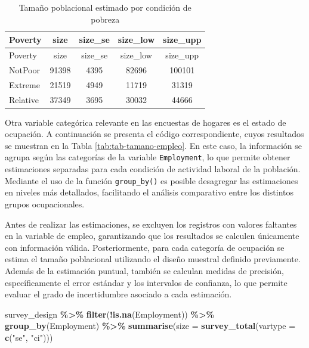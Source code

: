 \documentclass[
  spanish,
  12pt,
]{book}
\newenvironment{Shaded}{\begin{snugshade}}{\end{snugshade}}
\newcommand{\AttributeTok}[1]{\textcolor[rgb]{0.13,0.29,0.53}{#1}}
\newcommand{\FunctionTok}[1]{\textcolor[rgb]{0.13,0.29,0.53}{\textbf{#1}}}
\newcommand{\NormalTok}[1]{#1}
\newcommand{\SpecialCharTok}[1]{\textcolor[rgb]{0.81,0.36,0.00}{\textbf{#1}}}
\newcommand{\StringTok}[1]{\textcolor[rgb]{0.31,0.60,0.02}{#1}}
\begin{document}
\begin{longtable}[]{@{}lcccc@{}}
\caption{\label{tab:tab-tamano-pobreza}Tamaño poblacional estimado por condición de pobreza}\tabularnewline
\toprule\noalign{}
Poverty & size & size\_se & size\_low & size\_upp \\
\midrule\noalign{}
\endfirsthead
\toprule\noalign{}
Poverty & size & size\_se & size\_low & size\_upp \\
\midrule\noalign{}
\endhead
\bottomrule\noalign{}
\endlastfoot
NotPoor & 91398 & 4395 & 82696 & 100101 \\
Extreme & 21519 & 4949 & 11719 & 31319 \\
Relative & 37349 & 3695 & 30032 & 44666 \\
\end{longtable}

Otra variable categórica relevante en las encuestas de hogares es el estado de ocupación. A continuación se presenta el código correspondiente, cuyos resultados se muestran en la Tabla \ref{tab:tab-tamano-empleo}. En este caso, la información se agrupa según las categorías de la variable \texttt{Employment}, lo que permite obtener estimaciones separadas para cada condición de actividad laboral de la población. Mediante el uso de la función \texttt{group\_by()} es posible desagregar las estimaciones en niveles más detallados, facilitando el análisis comparativo entre los distintos grupos ocupacionales.

Antes de realizar las estimaciones, se excluyen los registros con valores faltantes en la variable de empleo, garantizando que los resultados se calculen únicamente con información válida. Posteriormente, para cada categoría de ocupación se estima el tamaño poblacional utilizando el diseño muestral definido previamente. Además de la estimación puntual, también se calculan medidas de precisión, específicamente el error estándar y los intervalos de confianza, lo que permite evaluar el grado de incertidumbre asociado a cada estimación.

\begin{Shaded}
\begin{Highlighting}[]
\NormalTok{survey\_design }\SpecialCharTok{\%\textgreater{}\%}
  \FunctionTok{filter}\NormalTok{(}\SpecialCharTok{!}\FunctionTok{is.na}\NormalTok{(Employment)) }\SpecialCharTok{\%\textgreater{}\%}
  \FunctionTok{group\_by}\NormalTok{(Employment) }\SpecialCharTok{\%\textgreater{}\%}
  \FunctionTok{summarise}\NormalTok{(}\AttributeTok{size =} \FunctionTok{survey\_total}\NormalTok{(}\AttributeTok{vartype =} \FunctionTok{c}\NormalTok{(}\StringTok{"se"}\NormalTok{, }\StringTok{"ci"}\NormalTok{)))}
\end{Highlighting}
\end{Shaded}
\end{document}
